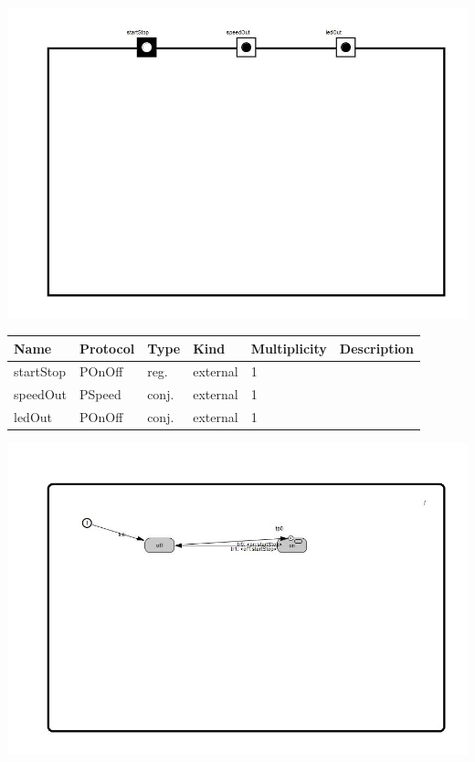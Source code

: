 
{
\centering{}
\includegraphics[width=1.0\textwidth]{./images/AHalGenRampUpDown_structure.jpg}
}

\begin{tabular}[ht]{|l|l|l|l|l|p{5cm}|}
\hline
\textbf{Name} & \textbf{Protocol} & \textbf{Type} & \textbf{Kind} & \textbf{Multiplicity} & \textbf{Description}\\
\hline
startStop & POnOff & reg. & external & 1 & \\
\hline
speedOut & PSpeed & conj. & external & 1 & \\
\hline
ledOut & POnOff & conj. & external & 1 & \\
\hline
\end{tabular}

{
\centering{}
\includegraphics[width=1.0\textwidth]{./images/AHalGenRampUpDown_behavior.jpg}
}

